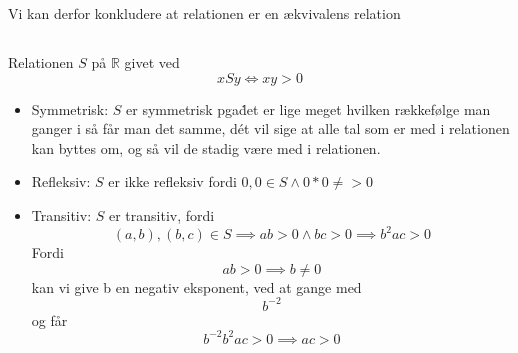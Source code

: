 \documentclass[12pt, a4paper, hidelinks]{article}
\newcommand{\RR}{\mathbb{R}}
\begin{document}
Vi kan derfor konkludere at relationen er en ækvivalens relation

\subsection{}

Relationen $S$ på $\RR$ givet ved
\[
xSy \Longleftrightarrow xy > 0
\]


\begin{itemize}
    \item{Symmetrisk:}
$S$ er symmetrisk pga\. det er lige meget hvilken rækkefølge man ganger i så får man det samme, dét vil sige
at alle tal som er med i relationen kan byttes om, og så vil de stadig være med i relationen.


    \item{Refleksiv:}
$S$ er ikke refleksiv fordi 
$ 0,0 \in S \land 0*0 \neq > 0 $

    \item{Transitiv:}
$S$ er transitiv, fordi 
$$ (a,b),(b,c) \in S \implies ab > 0 \land bc > 0 \implies b^{2}ac > 0 $$
Fordi $$ ab > 0 \implies b \neq 0  $$
kan vi give b en negativ eksponent, ved at gange med  $$ b^{-2}  $$
og får
$$ b^{-2}b^{2}ac > 0 \implies ac > 0 $$
\end{itemize}
\end{document}

